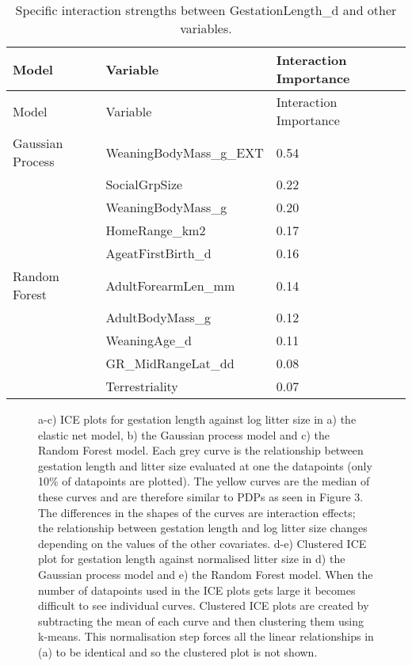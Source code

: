 \documentclass[12pt,]{article}
\begin{document}
\begin{table}[t!]
\begin{longtable}[c]{@{}lll@{}}
\caption{Specific interaction strengths between GestationLength\_d and other variables. \label{tbl:specificinter}}\tabularnewline
\toprule
Model & Variable & Interaction Importance\tabularnewline
\midrule
\endfirsthead
\toprule
Model & Variable & Interaction Importance\tabularnewline
\midrule
\endhead
Gaussian Process & WeaningBodyMass\_g\_EXT & 0.54\tabularnewline
& SocialGrpSize & 0.22\tabularnewline
& WeaningBodyMass\_g & 0.20\tabularnewline
& HomeRange\_km2 & 0.17\tabularnewline
& AgeatFirstBirth\_d & 0.16\tabularnewline
Random Forest & AdultForearmLen\_mm & 0.14\tabularnewline
& AdultBodyMass\_g & 0.12\tabularnewline
& WeaningAge\_d & 0.11\tabularnewline
& GR\_MidRangeLat\_dd & 0.08\tabularnewline
& Terrestriality & 0.07\tabularnewline
\bottomrule
\end{longtable}
\end{table}



\begin{figure}[t!]
  \centering


  \label{fig:ice}
  \caption{
    a-c) ICE plots for gestation length against log litter size in a) the elastic net model, b) the Gaussian process model and c) the Random Forest model.
    Each grey curve is the relationship between gestation length and litter size evaluated at one the datapoints (only 10\% of datapoints are plotted). 
    The yellow curves are the median of these curves and are therefore similar to PDPs as seen in Figure 3.
    The differences in the shapes of the curves are interaction effects; the relationship between gestation length and log litter size changes depending on the values of the other covariates.
    d-e) Clustered ICE plot for gestation length against normalised litter size in d) the Gaussian process model and e) the Random Forest model.
    When the number of datapoints used in the ICE plots gets large it becomes difficult to see individual curves.
    Clustered ICE plots are created by subtracting the mean of each curve and then clustering them using k-means.
    This normalisation step forces all the linear relationships in (a) to be identical and so the clustered plot is not shown. 
  }
\end{figure}
\end{document}
